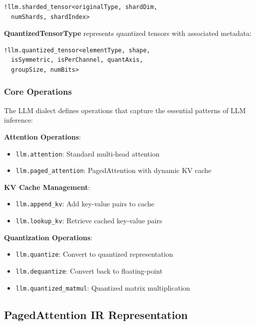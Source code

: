\documentclass[conference]{IEEEtran}
\begin{document}
\begin{mlircode}
\begin{lstlisting}[style=mlir]
!llm.sharded_tensor<originalType, shardDim, 
  numShards, shardIndex>
\end{lstlisting}
\end{mlircode}

\textbf{QuantizedTensorType} represents quantized tensors with associated metadata:

\begin{mlircode}
\begin{lstlisting}[style=mlir]
!llm.quantized_tensor<elementType, shape, 
  isSymmetric, isPerChannel, quantAxis, 
  groupSize, numBits>
\end{lstlisting}
\end{mlircode}

\subsubsection{Core Operations}

The LLM dialect defines operations that capture the essential patterns of LLM inference:

\textbf{Attention Operations}:
\begin{itemize}
    \item \texttt{llm.attention}: Standard multi-head attention
    \item \texttt{llm.paged\_attention}: PagedAttention with dynamic KV cache
\end{itemize}

\textbf{KV Cache Management}:
\begin{itemize}
    \item \texttt{llm.append\_kv}: Add key-value pairs to cache
    \item \texttt{llm.lookup\_kv}: Retrieve cached key-value pairs
\end{itemize}

\textbf{Quantization Operations}:
\begin{itemize}
    \item \texttt{llm.quantize}: Convert to quantized representation
    \item \texttt{llm.dequantize}: Convert back to floating-point
    \item \texttt{llm.quantized\_matmul}: Quantized matrix multiplication
\end{itemize}

\subsection{PagedAttention IR Representation}
\end{document}
